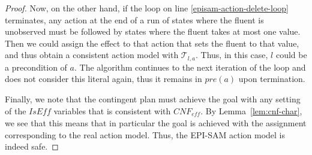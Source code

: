 \documentclass[letterpaper]{article} %
\newcommand{\pre}{\textit{pre}}
\newcommand{\eff}{\textit{eff}}
\newcommand{\iseff}{\textit{IsEff}}
\newcommand{\ispre}{\textit{IsPre}}
\begin{document}
\begin{proof}
Now, on the other hand, if the loop on line \ref{episam-action-delete-loop} terminates, any action at the end of a run of states where the fluent is unobserved must be followed by states where the fluent takes at most one value. Then we could assign the effect to that action that sets the fluent to that value, and thus obtain a consistent action model with $\mathcal{T}_{l,a}$. Thus, in this case, $l$ could be a precondition of $a$. The algorithm continues to the next iteration of the loop and does not consider this literal again, thus it remains in $\pre(a)$ upon termination.

Finally, we note that the contingent plan must achieve the goal with any setting of the $\iseff$ variables that is consistent with $CNF_{\eff}$. By Lemma~\ref{lem:cnf-char}, we see that this means that in particular the goal is achieved with the assignment corresponding to the real action model. Thus, the EPI-SAM action model is indeed safe.
\end{proof}
\end{document}
